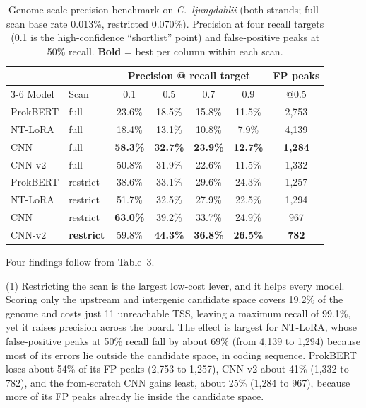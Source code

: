 \documentclass{article}
\begin{document}
\begin{table}[h]
\centering
\small
\caption{Genome-scale precision benchmark on \emph{C.\ ljungdahlii} (both strands; full-scan base rate 0.013\%, restricted 0.070\%). Precision at four recall targets (0.1 is the high-confidence ``shortlist'' point) and false-positive peaks at 50\% recall. \textbf{Bold} = best per column within each scan.}
\begin{tabular}{llccccc}
\toprule
 & & \multicolumn{4}{c}{Precision @ recall target} & FP peaks \\
\cmidrule(lr){3-6}
Model & Scan & 0.1 & 0.5 & 0.7 & 0.9 & @0.5 \\
\midrule
ProkBERT & full              & 23.6\% & 18.5\% & 15.8\% & 11.5\% & 2{,}753 \\
NT-LoRA  & full              & 18.4\% & 13.1\% & 10.8\% & 7.9\%  & 4{,}139 \\
CNN      & full              & \textbf{58.3\%} & \textbf{32.7\%} & \textbf{23.9\%} & \textbf{12.7\%} & \textbf{1{,}284} \\
CNN-v2   & full              & 50.8\% & 31.9\% & 22.6\% & 11.5\% & 1{,}332 \\
\midrule
ProkBERT & restrict          & 38.6\% & 33.1\% & 29.6\% & 24.3\% & 1{,}257 \\
NT-LoRA  & restrict          & 51.7\% & 32.5\% & 27.9\% & 22.5\% & 1{,}294 \\
CNN      & restrict          & \textbf{63.0\%} & 39.2\% & 33.7\% & 24.9\% & 967 \\
CNN-v2   & \textbf{restrict} & 59.8\% & \textbf{44.3\%} & \textbf{36.8\%} & \textbf{26.5\%} & \textbf{782} \\
\bottomrule
\end{tabular}
\end{table}

Four findings follow from Table~3.

(1) Restricting the scan is the largest low-cost lever, and it helps every model. Scoring only the upstream and intergenic candidate space covers 19.2\% of the genome and costs just 11 unreachable TSS, leaving a maximum recall of 99.1\%, yet it raises precision across the board. The effect is largest for NT-LoRA, whose false-positive peaks at 50\% recall fall by about 69\% (from 4{,}139 to 1{,}294) because most of its errors lie outside the candidate space, in coding sequence. ProkBERT loses about 54\% of its FP peaks (2{,}753 to 1{,}257), CNN-v2 about 41\% (1{,}332 to 782), and the from-scratch CNN gains least, about 25\% (1{,}284 to 967), because more of its FP peaks already lie inside the candidate space.
\end{document}
